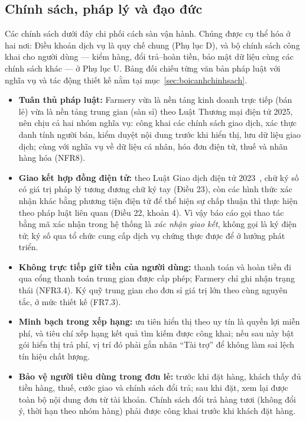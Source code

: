 \subsection{Chính sách, pháp lý và đạo đức}
\label{subsec:chinhsach}

Các chính sách dưới đây chi phối cách sàn vận hành. Chúng được cụ thể hóa ở hai nơi: Điều khoản dịch vụ là quy chế chung (Phụ lục D), và bộ chính sách công khai cho người dùng --- kiểm hàng, đổi trả--hoàn tiền, bảo mật dữ liệu cùng các chính sách khác --- ở Phụ lục U. Bảng đối chiếu từng văn bản pháp luật với nghĩa vụ và tác động thiết kế nằm tại mục~\ref{sec:boicanhchinhsach}.
\begin{itemize}
    \item \textbf{Tuân thủ pháp luật:} Farmery vừa là nền tảng kinh doanh trực tiếp (bán lẻ) vừa là nền tảng trung gian (sàn sỉ) theo Luật Thương mại điện tử 2025, nên chịu cả hai nhóm nghĩa vụ: công khai các chính sách giao dịch, xác thực danh tính người bán, kiểm duyệt nội dung trước khi hiển thị, lưu dữ liệu giao dịch; cùng với nghĩa vụ về dữ liệu cá nhân, hóa đơn điện tử, thuế và nhãn hàng hóa (NFR8).
    \item \textbf{Giao kết hợp đồng điện tử:} theo Luật Giao dịch điện tử 2023~\cite{luatgddt2023}, chữ ký số có giá trị pháp lý tương đương chữ ký tay (Điều 23), còn các hình thức xác nhận khác bằng phương tiện điện tử để thể hiện sự chấp thuận thì thực hiện theo pháp luật liên quan (Điều 22, khoản 4). Vì vậy báo cáo gọi thao tác bằng mã xác nhận trong hệ thống là \emph{xác nhận giao kết}, không gọi là ký điện tử; ký số qua tổ chức cung cấp dịch vụ chứng thực được để ở hướng phát triển.
    \item \textbf{Không trực tiếp giữ tiền của người dùng:} thanh toán và hoàn tiền đi qua cổng thanh toán trung gian được cấp phép; Farmery chỉ ghi nhận trạng thái (NFR3.4). Ký quỹ trung gian cho đơn sỉ giá trị lớn theo cùng nguyên tắc, ở mức thiết kế (FR7.3).
    \item \textbf{Minh bạch trong xếp hạng:} ưu tiên hiển thị theo uy tín là quyền lợi miễn phí, và tiêu chí xếp hạng kết quả tìm kiếm được công khai; nếu sau này bật gói hiển thị trả phí, vị trí đó phải gắn nhãn ``Tài trợ'' để không làm sai lệch tín hiệu chất lượng.
    \item \textbf{Bảo vệ người tiêu dùng trong đơn lẻ:} trước khi đặt hàng, khách thấy đủ tiền hàng, thuế, cước giao và chính sách đổi trả; sau khi đặt, xem lại được toàn bộ nội dung đơn từ tài khoản. Chính sách đổi trả hàng tươi (không đổi ý, thời hạn theo nhóm hàng) phải được công khai trước khi khách đặt hàng.

\end{itemize}
